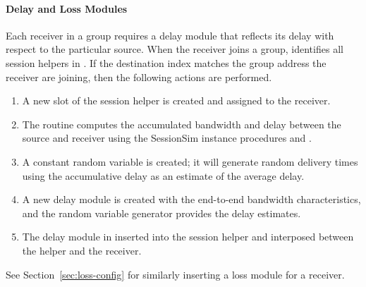 \paragraph{Delay and Loss Modules}

Each receiver in a group requires a delay module that
reflects its delay with respect to the particular source.
When the receiver joins a group, 
 identifies all session helpers in .
If the destination index matches the group address
the receiver are joining, then the following actions are performed.
\begin{enumerate}
\item A new slot of the session helper is created and assigned to the receiver.
\item The routine computes the accumulated bandwidth and delay
  between the source and receiver using the SessionSim instance procedures
   and .
\item A constant random variable is created; it will generate random delivery
  times using the accumulative delay as an estimate of the average delay.
\item A new delay module is created with the end-to-end bandwidth
  characteristics, and the random variable generator provides the delay
  estimates.
\item The delay module in inserted into the session helper and interposed
  between the helper and the receiver.
\end{enumerate}
See Section~\ref{sec:loss-config} for similarly
inserting a loss module for a receiver.



